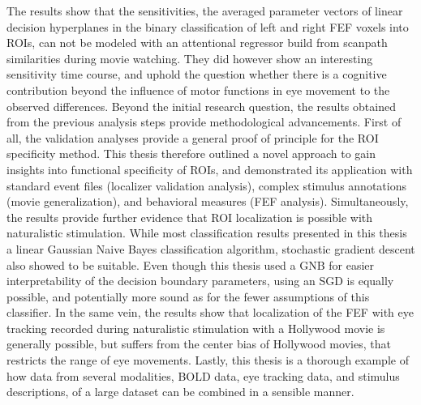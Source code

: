 \documentclass[a4paper, 12pt]{scrreprt}
\begin{document}
The results show that the sensitivities, the averaged parameter vectors of linear decision hyperplanes in the binary classification of left and right FEF voxels into ROIs, can not be modeled with an attentional regressor build from scanpath similarities during movie watching. They did however show an interesting sensitivity time course, and uphold the question whether there is a cognitive contribution beyond the influence of motor functions in eye movement to the observed differences. Beyond the initial research question, the results obtained from the previous analysis steps provide methodological advancements. First of all, the validation analyses provide a general proof of principle for the ROI specificity method. This thesis therefore outlined a novel approach to gain insights into functional specificity of ROIs, and demonstrated its application with standard event files (localizer validation analysis), complex stimulus annotations (movie generalization), and behavioral measures (FEF analysis). Simultaneously, the results provide further evidence that ROI localization is possible with naturalistic stimulation. While most classification results presented in this thesis a linear Gaussian Naive Bayes classification algorithm, stochastic gradient descent also showed to be suitable. Even though this thesis used a GNB for easier interpretability of the decision boundary parameters, using an SGD is equally possible, and potentially more sound as for the fewer assumptions of this classifier. In the same vein, the results show that localization of the FEF with eye tracking recorded during naturalistic stimulation with a Hollywood movie is generally possible, but suffers from the center bias of Hollywood movies, that restricts the range of eye movements. Lastly, this thesis is a thorough example of how data from several modalities, BOLD data, eye tracking data, and stimulus descriptions, of a large dataset can be combined in a sensible manner. \\
\end{document}
